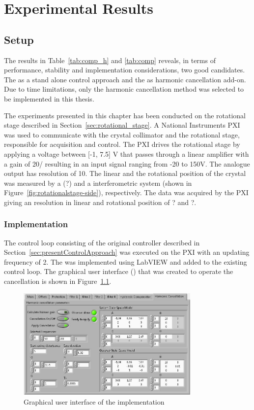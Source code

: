 \chapter{Experimental Results}\label{cha:exp_result}
\section{Setup}\label{sec:setup}
The results in Table~\ref{tab:comp_h} and \ref{tab:comp} reveals, in terms of performance, stability and implementation considerations, two good candidates. The \abbrIRC  as a stand alone control approach and the \abbrRFDC as harmonic cancellation add-on. Due to time limitations, only the harmonic cancellation method was selected to be implemented in this thesis.

The experiments presented in this chapter has been conducted on the rotational stage described in Section~\ref{sec:rotational_stage}. A National Instruments PXI was used to communicate with the crystal collimator and the rotational stage, responsible for acquisition and control. The PXI drives the rotational stage by applying a voltage between [-1, 7.5] V that passes through a linear amplifier with a gain of \unit{20}{\volt/\volt} resulting in an input signal ranging from -20 to 150V. The analogue output has resolution of \unit{10}{\micro\volt}. The linear and the rotational position of the crystal was measured by a (?) and a interferometric system (shown in Figure~\ref{fig:rotationalstage-side}), respectively. The data was acquired by the PXI giving an resolution in linear and rotational position of \unit{?}{\nano\radian} and \unit{?}{\milli\meter}.


\subsection{Implementation}
The control loop consisting of the original controller described in Section~\ref{sec:presentControlApproach} was executed on the PXI with an updating frequency of \unit{2}{\kilo\hertz}. The \abbrRFDC was implemented using LabVIEW and added to the existing control loop. The graphical user interface (\abbrGUI) that was created to operate the cancellation is shown in Figure~\ref{fig:gui}.

\begin{figure}[h]
  \centering %
  \includegraphics[width=0.8\textwidth]{fig/HC_gui}
  \caption{\label{fig:gui}Graphical user interface of the \abbrRFDC implementation}
\end{figure}

